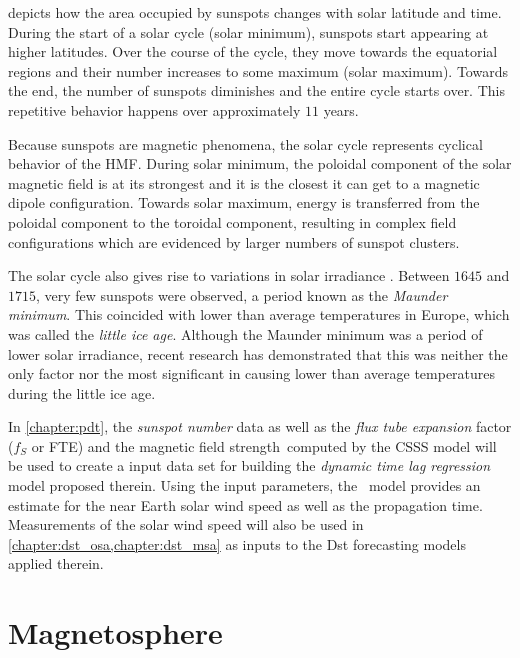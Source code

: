  depicts how the area occupied by sunspots changes with solar latitude 
and time. During the start of a solar cycle (solar minimum), sunspots start appearing at higher 
latitudes. Over the course of the cycle, they move towards the equatorial regions and their number 
increases to some maximum (solar maximum). Towards the end, the number of sunspots diminishes and 
the entire cycle starts over. This repetitive behavior happens over approximately $11$ years.

Because sunspots are magnetic phenomena, the solar cycle represents cyclical behavior of the HMF. 
During solar minimum, the poloidal component of the solar magnetic field is at its strongest and it 
is the closest it can get to a magnetic dipole configuration. Towards solar maximum, energy is 
transferred from the poloidal component to the toroidal component, resulting in complex field 
configurations which are evidenced by larger numbers of sunspot clusters.

The solar cycle also gives rise to variations in solar irradiance \citep{solarirradiance}. Between 
$1645$ and $1715$, very few sunspots were observed, a period known as the \emph{Maunder minimum}. 
This coincided with lower than average temperatures in Europe, which was called the 
\emph{little ice age}. Although the Maunder minimum was a period of lower solar irradiance, 
recent research \citep{owens2017maunder} has demonstrated that this was neither the only factor 
nor the most significant in causing lower than average temperatures during the little ice age.

In \cref{chapter:pdt}, the \emph{sunspot number} data as well as the \emph{flux tube expansion} 
factor ($f_S$ or FTE) and the magnetic field strength computed by the CSSS model will be used to 
create a input data set for building the \emph{dynamic time lag regression} model proposed therein. 
Using the input parameters, the \XX \ model provides an estimate for the near Earth solar wind 
speed as well as the propagation time. Measurements of the solar wind speed will also be used in 
\cref{chapter:dst_osa,chapter:dst_msa} as inputs to the Dst forecasting models applied therein.


\section{Magnetosphere}\label{sec:mag}


